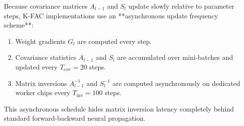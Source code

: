 Because covariance matrices $A_{l-1}$ and $S_l$ update slowly relative to parameter steps, K-FAC implementations use an **asynchronous update frequency scheme**:
\begin{enumerate}[leftmargin=*]
    \item Weight gradients $G_l$ are computed every step.
    \item Covariance statistics $A_{l-1}$ and $S_l$ are accumulated over mini-batches and updated every $T_{\text{cov}} = 20$ steps.
    \item Matrix inversions $A_{l-1}^{-1}$ and $S_l^{-1}$ are computed asynchronously on dedicated worker chips every $T_{\text{inv}} = 100$ steps.
\end{enumerate}

This asynchronous schedule hides matrix inversion latency completely behind standard forward-backward neural propagation.
